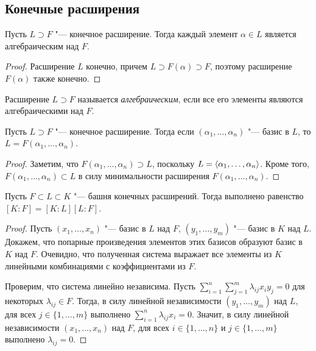 \subsection{Конечные расширения}

\begin{proposition}
	Пусть $L \supset F$ "--- конечное расширение. Тогда каждый элемент $\alpha \in L$ является алгебраическим над $F$.
\end{proposition}

\begin{proof}
	Расширение $L$ конечно, причем $L \supset F(\alpha) \supset F$, поэтому расширение $F(\alpha)$ также конечно.
\end{proof}

\begin{definition}
	Расширение $L \supset F$ называется \textit{алгебраическим}, если все его элементы являются алгебраическими над $F$.
\end{definition}

\begin{proposition}
	Пусть $L \supset F$ "--- конечное расширение. Тогда если $(\alpha_1, \dotsc, \alpha_n)$ "--- базис в $L$, то $L = F(\alpha_1, \dotsc, \alpha_n)$.
\end{proposition}

\begin{proof}
	Заметим, что $F(\alpha_1, \dotsc, \alpha_n) \supset L$, поскольку $L = \langle\alpha_1, \dotsc, \alpha_n\rangle$. Кроме того, $F(\alpha_1, \dotsc, \alpha_n) \subset L$ в силу минимальности расширения $F(\alpha_1, \dotsc, \alpha_n)$.
\end{proof}

\begin{proposition}
	Пусть $F \subset L \subset K$ "--- башня конечных расширений. Тогда выполнено равенство $[K : F] = [K : L][L : F]$.
\end{proposition}

\begin{proof}
	Пусть $(x_1, \dotsc, x_n)$ "--- базис в $L$ над $F$, $(y_1, \dotsc, y_m)$ "--- базис в $K$ над $L$. Докажем, что попарные произведения элементов этих базисов образуют базис в $K$ над $F$. Очевидно, что полученная система выражает все элементы из $K$ линейными комбинациями с коэффициентами из $F$.
	
	Проверим, что система линейно независима. Пусть $\sum_{i = 1}^n\sum_{j = 1}^m \lambda_{ij}x_iy_j = 0$ для некоторых $\lambda_{ij} \in F$. Тогда, в силу линейной независимости $(y_1, \dotsc, y_m)$ над $L$, для всех $j \in \{1, \dotsc, m\}$ выполнено $\sum_{i = 1}^n\lambda_{ij}x_i = 0$. Значит, в силу линейной независимости $(x_1, \dotsc, x_n)$ над $F$, для всех $i \in \{1, \dotsc, n\}$ и $j \in \{1, \dotsc, m\}$ выполнено $\lambda_{ij} = 0$.
\end{proof}

